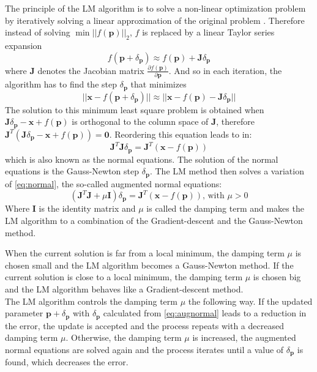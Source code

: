 The principle of the \ac{LM} algorithm is to solve a non-linear optimization problem by iteratively solving a linear approximation of the original problem \cite{Dahmen2013}. Therefore instead of solving $\min ||f(\mathbf{p})||_2$, $f$ is replaced by a linear Taylor series expansion
\begin{equation} 
  f(\mathbf{p} + \delta_{\mathbf{p}}) \approx f(\mathbf{p}) + \mathbf{J} \delta_{\mathbf{p}}
\end{equation}
where $\mathbf{J}$ denotes the Jacobian matrix $\frac{\partial f(\mathbf{p})}{\partial \mathbf{p}}$. And so in each iteration, the algorithm has to find the step $\delta_{\mathbf{p}}$ that minimizes
\begin{equation} 
  || \mathbf{x} - f(\mathbf{p} + \delta_{\mathbf{p}})|| \approx ||\mathbf{x} - f(\mathbf{p}) - \mathbf{J} \delta_{\mathbf{p}}||
\end{equation}
The solution to this minimum least square problem is obtained when $\mathbf{J}\delta_{\mathbf{p}} - \mathbf{x} + f(\mathbf{p})$ is orthogonal to the column space of $\mathbf{J}$, therefore $\mathbf{J}^T(\mathbf{J} \delta_{\mathbf{p}} - \mathbf{x} + f(\mathbf{p})) = \mathbf{0}$. Reordering this equation leads to in: 
\begin{equation} 
  \mathbf{J}^T\mathbf{J}\delta_{\mathbf{p}} = \mathbf{J}^T(\mathbf{x} - f(\mathbf{p}))
  \label{eq:normal}
\end{equation}
which is also known as the normal equations. The solution of the normal equations is the Gauss-Newton step $\delta_{\mathbf{p}}$.
The \ac{LM} method then solves a variation of \autoref{eq:normal}, the so-called augmented normal equations:
\begin{equation} 
  (\mathbf{J}^T\mathbf{J} + \mu \mathbf{I})\delta_{\mathbf{p}} = \mathbf{J}^T(\mathbf{x} -f(\mathbf{p})) \text{, with } \mu > 0
  \label{eq:augnormal}
\end{equation}
Where $\mathbf{I}$ is the identity matrix and $\mu$ is called the damping term and makes the \ac{LM} algorithm to a combination of the Gradient-descent and the Gauss-Newton method.

When the current solution is far from a local minimum, the damping term $\mu$ is chosen small and the \ac{LM} algorithm becomes a Gauss-Newton method. If the current solution is close to a local minimum, the damping term $\mu$ is chosen big and the \ac{LM} algorithm behaves like a Gradient-descent method.\\

The \ac{LM} algorithm controls the damping term $\mu$ the following way. If the updated parameter $\mathbf{p} + \delta_{\mathbf{p}}$ with $\delta_{\mathbf{p}}$ calculated from \autoref{eq:augnormal} leads to a reduction in the error, the update is accepted and the process repeats with a decreased damping term $\mu$. Otherwise, the damping term $\mu$ is increased, the augmented normal equations are solved again and the process iterates until a value of $\delta_{\mathbf{p}}$ is found, which decreases the error.\\

